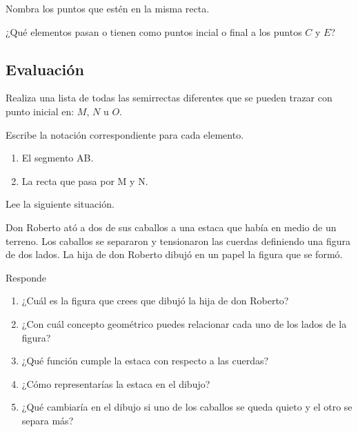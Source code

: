 \documentclass[10pt,twoside]{article}
\begin{document}
\begin{enumerate}
\item Nombra los puntos que estén en la misma recta.
\item ¿Qué elementos pasan o tienen como puntos incial o final a los puntos $C$ y $E$?
\subsection*{Evaluaci\'{o}n}
\begin{minipage}{.3\textwidth}
\usetikzlibrary{arrows}
\end{minipage}\hfill
\begin{minipage}{.5\textwidth}
\item Realiza una lista de todas las semirrectas diferentes que se pueden trazar con punto inicial en: $M$, $N$ u $O$.
\item Escribe la notación correspondiente para cada elemento.
\begin{enumerate}
\item El segmento AB.
\item La recta que pasa por M y N.
\end{enumerate}	
\end{minipage}
\item Lee la siguiente situación.

Don Roberto ató a dos de sus caballos a una estaca que había en medio de un terreno. Los caballos se separaron y tensionaron las cuerdas definiendo una figura de dos lados. La hija de don Roberto dibujó en un papel la figura que se formó.

Responde
\begin{enumerate}
\item ¿Cuál es la figura que crees que dibujó la hija de don Roberto?
\item ¿Con cuál concepto geométrico puedes relacionar cada uno de
los lados de la figura?
\item ¿Qué función cumple la estaca con respecto a las cuerdas?
\item ¿Cómo representarías la estaca en el dibujo?
\item ¿Qué cambiaría en el dibujo si uno de los caballos se queda
quieto y el otro se separa más?
\end{enumerate}
\end{enumerate}
\end{document}
